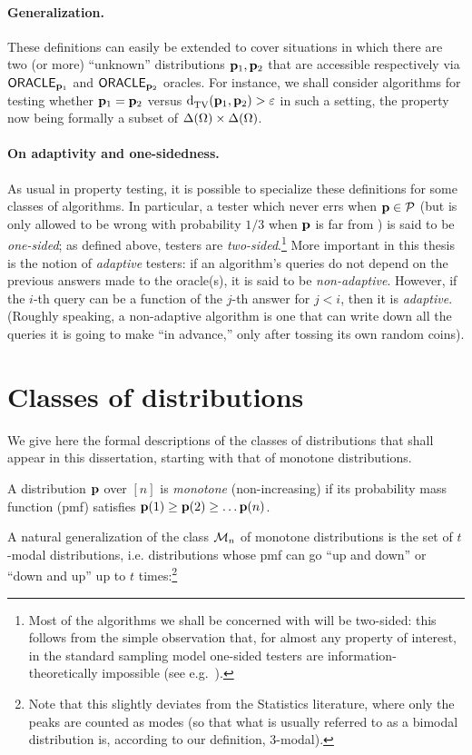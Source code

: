 \paragraph{Generalization.} These definitions can easily be extended to cover situations in which there are two (or more) ``unknown'' distributions $\mathbf{p}_1,\mathbf{p}_2$ that are accessible respectively via ${\sf ORACLE}_{\mathbf{p}_1}$ and ${\sf ORACLE}_{\mathbf{p}_2}$ oracles. For instance, we shall consider algorithms for testing whether $\mathbf{p}_1 = \mathbf{p}_2$ versus  ${\operatorname{d}_{\rm{TV}}^{}\!\left({\mathbf{p}_1, \mathbf{p}_2}\right)} > \varepsilon$ in such a setting, the property now being formally a subset of $\Delta\!\left({\Omega}\right)\times\Delta\!\left({\Omega}\right)$.

\paragraph{On adaptivity and one-sidedness.} As usual in property testing, it is possible to specialize these definitions for some classes of algorithms. In particular, a tester which never errs when $\mathbf{p}\in\mathcal{P}$ (but is only allowed to be wrong with probability $1/3$ when $\mathbf{p}$ is far from \property) is said to be \emph{one-sided}; as defined above, testers are \emph{two-sided}.\footnote{Most of the algorithms we shall be concerned with will be two-sided: this follows from the simple observation that, for almost any property of interest, in the standard sampling model one-sided testers are information-theoretically impossible (see e.g.~\cite[Chapter 11]{Gol:17}).}{} More important in this thesis is the notion of \emph{adaptive} testers: if an algorithm's queries do not depend on the previous answers made to the oracle(s), it is said to be \emph{non-adaptive}. However, if the $i$-th query can be a function of the $j$-th answer for $j< i$, then it is \emph{adaptive}. (Roughly speaking, a non-adaptive algorithm is one that can write down all the queries it is going to make ``in advance,'' only after tossing its own random coins).

\section{Classes of distributions}\label{ssec:class:definitions}

We give here the formal descriptions of the classes of distributions that shall appear in this dissertation, starting with that of monotone distributions.
\begin{definition}[monotone]\label{def:monotone}
A distribution $\mathbf{p}$ over $[n]$ is \emph{monotone} (non-increasing) if its probability mass function (pmf) satisfies $\mathbf{p}(1) \geq \mathbf{p}(2) \geq \dots \mathbf{p}(n)$.
\end{definition}
 A natural generalization of the class $\mathcal{M}_{n}$ of monotone distributions is the set of $t$-modal distributions, i.e. distributions whose pmf can go ``up and down'' or ``down and up'' up to $t$ times:\footnote{Note that this slightly deviates from the Statistics literature, where only the peaks are counted as modes (so that what is usually referred to as a bimodal distribution is, according to our definition, $3$-modal).}

